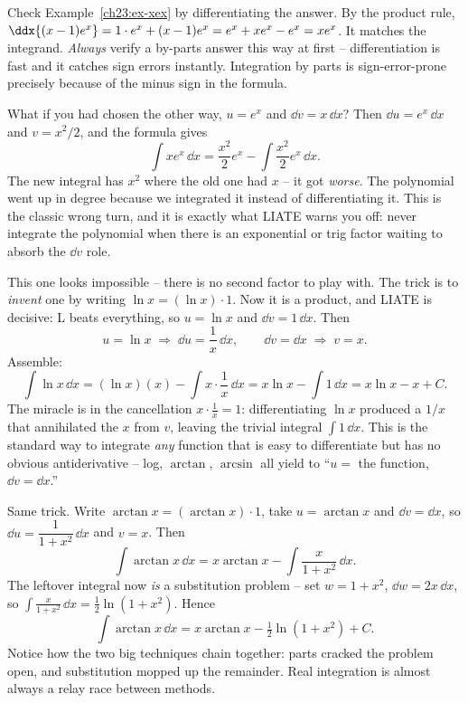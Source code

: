 \begin{labbox}
Check Example~\ref{ch23:ex-xex} by differentiating the answer. By the product
rule, $\ddx{(x-1)e^x} = 1\cdot e^x + (x-1)e^x = e^x + xe^x - e^x = xe^x$. It
matches the integrand. \emph{Always} verify a by-parts answer this way at first --
differentiation is fast and it catches sign errors instantly. Integration by
parts is sign-error-prone precisely because of the minus sign in the formula.
\end{labbox}

\begin{trapbox}
What if you had chosen the other way, $u=e^x$ and $\dd v = x\,\dd x$? Then
$\dd u = e^x\,\dd x$ and $v = x^2/2$, and the formula gives
\[
\int x e^x\,\dd x = \frac{x^2}{2}e^x - \int \frac{x^2}{2}e^x\,\dd x.
\]
The new integral has $x^2$ where the old one had $x$ -- it got \emph{worse}. The
polynomial went up in degree because we integrated it instead of differentiating
it. This is the classic wrong turn, and it is exactly what LIATE warns you off:
never integrate the polynomial when there is an exponential or trig factor
waiting to absorb the $\dd v$ role.
\end{trapbox}

\begin{example}
\label{ch23:ex-lnx}
This one looks impossible -- there is no second factor to play with. The trick is
to \emph{invent} one by writing $\ln x = (\ln x)\cdot 1$. Now it is a product, and
LIATE is decisive: L beats everything, so $u = \ln x$ and $\dd v = 1\,\dd x$.
Then
\[
u = \ln x \;\Rightarrow\; \dd u = \frac{1}{x}\,\dd x, \qquad
\dd v = \dd x \;\Rightarrow\; v = x.
\]
Assemble:
\[
\int \ln x\,\dd x = (\ln x)(x) - \int x\cdot\frac{1}{x}\,\dd x
= x\ln x - \int 1\,\dd x = x\ln x - x + C.
\]
The miracle is in the cancellation $x\cdot\frac{1}{x}=1$: differentiating $\ln x$
produced a $1/x$ that annihilated the $x$ from $v$, leaving the trivial integral
$\int 1\,\dd x$. This is the standard way to integrate \emph{any} function that is
easy to differentiate but has no obvious antiderivative -- log, $\arctan$,
$\arcsin$ all yield to ``$u=$ the function, $\dd v = \dd x$.''
\end{example}

\begin{example}
\label{ch23:ex-arctan}
Same trick. Write $\arctan x = (\arctan x)\cdot 1$, take $u=\arctan x$ and
$\dd v = \dd x$, so $\dd u = \dfrac{1}{1+x^2}\,\dd x$ and $v=x$. Then
\[
\int \arctan x\,\dd x = x\arctan x - \int \frac{x}{1+x^2}\,\dd x.
\]
The leftover integral now \emph{is} a substitution problem -- set $w = 1+x^2$,
$\dd w = 2x\,\dd x$, so $\int \frac{x}{1+x^2}\,\dd x = \frac12\ln(1+x^2)$. Hence
\[
\int \arctan x\,\dd x = x\arctan x - \tfrac12\ln(1+x^2) + C.
\]
Notice how the two big techniques chain together: parts cracked the problem open,
and substitution mopped up the remainder. Real integration is almost always a
relay race between methods.
\end{example}

